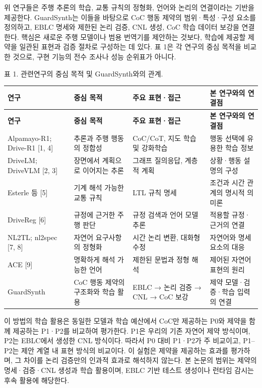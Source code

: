 \documentclass[11pt,a4paper]{article}
\begin{document}
위 연구들은 주행 추론의 학습, 교통 규칙의 정형화, 언어와 논리의 연결이라는 기반을 제공한다. GuardSynth는 이들을 바탕으로 CoC 행동 제약의 범위·특성·구성 요소를 정의하고, EBLC 명세와 제한된 논리 검증, CNL 생성, CoC 학습 데이터 보강을 연결한다. 핵심은 새로운 주행 모델이나 범용 번역기를 제안하는 것보다, 학습에 제공할 제약을 일관된 표현과 검증 절차로 구성하는 데 있다. 표 1은 각 연구의 중심 목적을 비교한 것으로, 구현 기능의 전수 조사나 성능 순위표가 아니다.\par

표 1. 관련연구의 중심 목적 및 GuardSynth와의 관계.\par

\begingroup\small
\begin{longtable}{@{}>{\raggedright\arraybackslash}p{}>{\raggedright\arraybackslash}p{}>{\raggedright\arraybackslash}p{}>{\raggedright\arraybackslash}p{}@{}}
\toprule
\textbf{연구} & \textbf{중심 목적} & \textbf{주요 표현·접근} & \textbf{본 연구와의 연결점} \\
\midrule\endfirsthead
\toprule
\textbf{연구} & \textbf{중심 목적} & \textbf{주요 표현·접근} & \textbf{본 연구와의 연결점} \\
\midrule\endhead
\bottomrule\endfoot
Alpamayo-R1; Drive-R1 [1, 4] & 추론과 주행 행동의 정합성 & CoC/CoT, 지도 학습 및 강화학습 & 행동 선택에 유용한 학습 정보 \\
DriveLM; DriveVLM [2, 3] & 장면에서 계획으로 이어지는 추론 & 그래프 질의응답, 계층적 계획 & 상황·행동 설명의 구성 \\
Esterle 등 [5] & 기계 해석 가능한 교통 규칙 & LTL 규칙 명세 & 조건과 시간 관계의 명시적 의미론 \\
DriveReg [6] & 규정에 근거한 주행 판단 & 규정 검색과 언어 모델 추론 & 적용할 규정·근거의 연결 \\
NL2TL; nl2spec [7, 8] & 자연어 요구사항의 정형화 & 시간 논리 변환, 대화형 수정 & 자연어와 명세 요소의 대응 \\
ACE [9] & 명확하게 해석 가능한 언어 & 제한된 문법과 정형 해석 & 제어된 자연어 표현의 원리 \\
GuardSynth & CoC 행동 제약의 구조화와 학습 활용 & EBLC → 논리 검증 → CNL → CoC 보강 & 제약 모델·검증·학습 입력의 연결 \\
\end{longtable}
\endgroup

이 방법의 학습 활용은 동일한 모델과 학습 예산에서 CoC만 제공하는 P0와 제약을 함께 제공하는 P1·P2를 비교하여 평가한다. P1은 우리의 기존 자연어 제약 방식이며, P2는 EBLC에서 생성한 CNL 방식이다. 따라서 P0 대비 P1·P2가 주 비교이고, P1–P2는 제안 계열 내 표현 방식의 비교이다. 이 실험은 제약을 제공하는 효과를 평가하며, 그 차이를 논리 검증만의 인과적 효과로 해석하지 않는다. 본 논문의 범위는 제약의 명세·검증·CNL 생성과 학습 활용이며, EBLC 기반 테스트 생성이나 런타임 감시는 후속 활용에 해당한다.\par
\end{document}
